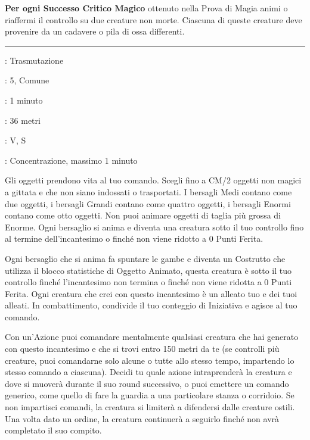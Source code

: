 \begin{multicols}{2}
\textbf{Per ogni Successo Critico Magico} ottenuto nella Prova di Magia animi o riaffermi il controllo su due creature non morte. Ciascuna di queste creature deve provenire da un cadavere o pila di ossa differenti.

\smallskip\noindent\rule{\linewidth}{2pt} \hypertarget{Animare Oggetti}{}\smallskip{}\label{Animate Object}
\noindent
\begin{description}[noitemsep, topsep=0pt, parsep=0pt, partopsep=0pt, leftmargin=0cm, labelwidth=2.8cm]
\item[\textbf{Lista di Magia}]: Trasmutazione
\item[\textbf{Livello}]: 5, Comune
\item[\textbf{T. di Lancio}]: 1 minuto
\item[\textbf{Gittata}]: 36 metri
\item[\textbf{Componenti}]: V, S
\item[\textbf{Durata}]: Concentrazione, massimo 1 minuto
\end{description}

Gli oggetti prendono vita al tuo comando. Scegli fino a CM/2 oggetti non magici a gittata e che non siano indossati o trasportati. I bersagli Medi contano come due oggetti, i bersagli Grandi contano come quattro oggetti, i bersagli Enormi contano come otto oggetti. Non puoi animare oggetti di taglia più grossa di Enorme. Ogni bersaglio si anima e diventa una creatura sotto il tuo controllo fino al termine dell'incantesimo o finché non viene ridotto a 0 Punti Ferita.

Ogni bersaglio che si anima fa spuntare le gambe e diventa un Costrutto che utilizza il blocco statistiche di Oggetto Animato, questa creatura è sotto il tuo controllo finché l'incantesimo non termina o finché non viene ridotta a 0 Punti Ferita. Ogni creatura che crei con questo incantesimo è un alleato tuo e dei tuoi alleati. In combattimento, condivide il tuo conteggio di Iniziativa e agisce al tuo comando.

Con un'Azione puoi comandare mentalmente qualsiasi creatura che hai generato con questo incantesimo e che si trovi entro 150 metri da te (se controlli più creature, puoi comandarne solo alcune o tutte allo stesso tempo, impartendo lo stesso comando a ciascuna).
Decidi tu quale azione intraprenderà la creatura e dove si muoverà durante il suo round successivo, o puoi emettere un comando generico, come quello di fare la guardia a una particolare stanza o corridoio.
Se non impartisci comandi, la creatura si limiterà a difendersi dalle creature ostili. Una volta dato un ordine, la creatura continuerà a seguirlo finché non avrà completato il suo compito.


\end{multicols}
